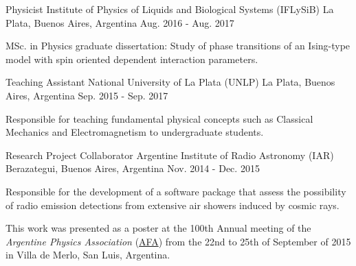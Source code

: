\begin{cventries}
  \cventry
    {Physicist} %
    {Institute of Physics of Liquids and Biological Systems (IFLySiB) \href{https://mattborghi.github.io/projects/MSc\%20Thesis/}{\faGithub}} %
    {La Plata, Buenos Aires, Argentina} %
    {Aug. 2016 - Aug. 2017} %
    {
      \begin{cvitems} %
        \item {MSc. in Physics graduate dissertation: Study of phase transitions of an Ising-type model with spin oriented dependent interaction parameters.}
      \end{cvitems}
    }

  \cventry
    {Teaching Assistant} %
    {National University of La Plata (UNLP)} %
    {La Plata, Buenos Aires, Argentina} %
    {Sep. 2015 - Sep. 2017} %
    {
      \begin{cvitems} %
        \item {Responsible for teaching fundamental physical concepts such as Classical Mechanics and Electromagnetism to undergraduate students.}
      \end{cvitems}
    }

  \cventry
    {Research Project Collaborator} %
    {Argentine Institute of Radio Astronomy (IAR) \href{https://mattborghi.github.io/projects/ALAMBRE/}{\faGithub}} %
    {Berazategui, Buenos Aires, Argentina} %
    {Nov. 2014 - Dec. 2015} %
    {
      \begin{cvitems} %
           \item {Responsible for the development of a software package that assess the possibility of radio emission detections from extensive air showers induced by cosmic rays.}
          \item {This work was presented as a poster at the 100th Annual meeting of the \emph{Argentine Physics Association} (\href{https://www.fisica.org.ar/}{AFA}) from the 22nd to 25th of September of 2015 in Villa de Merlo, San Luis, Argentina.}
      \end{cvitems}
    }
 
\end{cventries}
